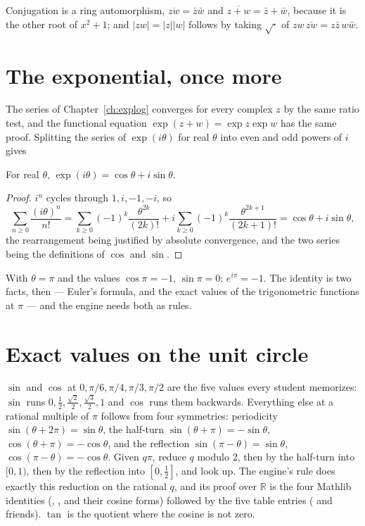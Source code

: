 Conjugation is a ring automorphism, $\overline{zw} = \bar z \bar w$ and $\overline{z + w} = \bar z
+ \bar w$, because it is the other root of $x^2 + 1$; and $|zw| = |z||w|$ follows by taking
$\sqrt{\cdot}$ of $zw\,\overline{zw} = z\bar z\, w \bar w$.

\section{The exponential, once more}

The series of Chapter~\ref{ch:explog} converges for every complex $z$ by the same ratio test, and
the functional equation $\exp(z + w) = \exp z \exp w$ has the same proof. Splitting the series of
$\exp(i\theta)$ for real $\theta$ into even and odd powers of $i$ gives

\begin{theorem}
  For real $\theta$, $\exp(i\theta) = \cos\theta + i \sin\theta$.
\end{theorem}
\begin{proof}
  $i^n$ cycles through $1, i, -1, -i$, so
  \[
    \sum_{n \ge 0} \frac{(i\theta)^n}{n!}
      = \sum_{k \ge 0} (-1)^k \frac{\theta^{2k}}{(2k)!} + i \sum_{k \ge 0} (-1)^k \frac{\theta^{2k+1}}{(2k+1)!}
      = \cos\theta + i\sin\theta,
  \]
  the rearrangement being justified by absolute convergence, and the two series being the
  definitions of $\cos$ and $\sin$.
\end{proof}

With $\theta = \pi$ and the values $\cos\pi = -1$, $\sin\pi = 0$: $e^{i\pi} = -1$. The identity is
two facts, then --- Euler's formula, and the exact values of the trigonometric functions at $\pi$
--- and the engine needs both as rules.

\section{Exact values on the unit circle}

$\sin$ and $\cos$ at $0, \pi/6, \pi/4, \pi/3, \pi/2$ are the five values every student memorizes:
$\sin$ runs $0, \frac{1}{2}, \frac{\sqrt 2}{2}, \frac{\sqrt 3}{2}, 1$ and $\cos$ runs them
backwards. Everything else at a rational multiple of $\pi$ follows from four symmetries:
periodicity $\sin(\theta + 2\pi) = \sin\theta$, the half-turn $\sin(\theta + \pi) = -\sin\theta$,
$\cos(\theta + \pi) = -\cos\theta$, and the reflection $\sin(\pi - \theta) = \sin\theta$,
$\cos(\pi - \theta) = -\cos\theta$. Given $q\pi$, reduce $q$ modulo $2$, then by the half-turn into
$[0, 1)$, then by the reflection into $[0, \frac{1}{2}]$, and look up. The engine's rule
 does exactly this reduction on the rational $q$, and its proof over
$\mathbb{R}$ is the four Mathlib identities (,
,  and their cosine forms) followed by the five table
entries ( and friends). $\tan$ is the quotient where the cosine is not
zero.

